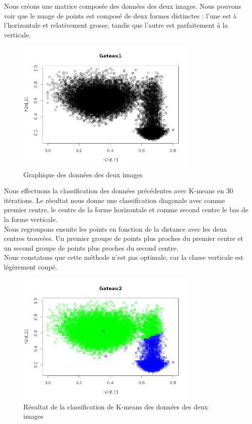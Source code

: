 \documentclass[a4paper,11pt]{article}
\begin{document}
  Nous créons une matrice composée des données des deux images. Nous pouvons voir que le nuage
  de points est composé de deux formes distinctes : l'une est à l'horizontale et relativement grosse, tandis 
  que l'autre est parfaitement à la verticale.
  
  \begin{figure}[H]
    \center
    \includegraphics[width=9cm]{resultat/image_combine.png}
    \caption{Graphique des données des deux images}
  \end{figure}
  
  Nous effectuons la classification des données précédentes avec K-means en 30 itérations. Le résultat
  nous donne une classification diagonale avec comme premier centre, le centre de la forme horizontale et 
  comme second centre le bas de la forme verticale.\\
  
  Nous regroupons ensuite les points en fonction de la distance avec les deux centres trouvées. 
  Un premier groupe de points plus proches du premier centre et un second groupe de points plus 
  proches du second centre.\\
  
  Nous constatons que cette méthode n'est pas optimale, car la classe verticale est légèrement coupé.\\
  
  \begin{figure}[H]
    \center
    \includegraphics[width=9cm]{resultat/classification_gateau.png}
    \caption{Résultat de la classification de K-means des données des deux images}
  \end{figure}
  
\end{document}
